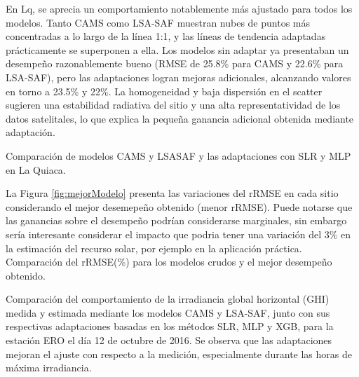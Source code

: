 \documentclass[letterpaper,12pt, twoside]{report}
\providecommand{\DIFdeltex}[1]{{\protect\color{red} \scriptsize #1}} %
\providecommand{\DIFdelFL}[1]{\DIFdel{#1}} %
\providecommand{\DIFdel}[1]{\texorpdfstring{\DIFdeltex{#1}}{}} %
\begin{document}
\DIFdel{En Lq, se aprecia un comportamiento notablemente más ajustado para todos los modelos. Tanto CAMS como LSA-SAF muestran nubes de puntos más concentradas a lo largo de la línea 1:1, y las líneas de tendencia adaptadas prácticamente se superponen a ella. Los modelos sin adaptar ya presentaban un desempeño razonablemente bueno (RMSE de 25.8\% para CAMS y 22.6\% para LSA-SAF), pero las adaptaciones logran mejoras adicionales, alcanzando valores en torno a 23.5\% y 22\%. La homogeneidad y baja dispersión en el scatter sugieren una estabilidad radiativa del sitio y una alta representatividad de los datos satelitales, lo que explica la pequeña ganancia adicional obtenida mediante adaptación.
}%

{%
\DIFdelFL{Comparación de modelos CAMS y LSASAF y las adaptaciones con SLR y MLP en La Quiaca.}}

\DIFdel{La Figura \ref{fig:mejorModelo} presenta las variaciones del rRMSE en cada sitio considerando el mejor desemepeño obtenido (menor rRMSE). Puede notarse que las ganancias sobre el desempeño podrían considerarse marginales, sin embargo sería interesante considerar el impacto que podria tener una variación del 3\% en la estimación del recurso solar, por ejemplo en la aplicación práctica. }%
{%
\DIFdelFL{Comparación del rRMSE(\%) para los modelos crudos y el mejor desempeño obtenido.}}

{%
\DIFdelFL{Comparación del comportamiento de la irradiancia global horizontal (GHI) medida y estimada mediante los modelos CAMS y LSA-SAF, junto con sus respectivas adaptaciones basadas en los métodos SLR, MLP y XGB, para la estación ERO el día 12 de octubre de 2016. Se observa que las adaptaciones mejoran el ajuste con respecto a la medición, especialmente durante las horas de máxima irradiancia.}}
\end{document}
